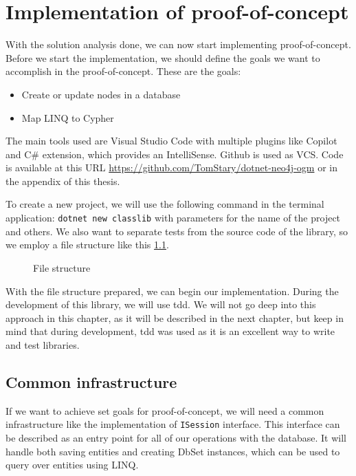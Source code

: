 \chapter {Implementation of proof-of-concept}

With the solution analysis done, we can now start implementing proof-of-concept.
Before we start the implementation, we should define the goals we want to accomplish in the proof-of-concept.
These are the goals:
\begin{itemize}
    \item {Create or update nodes in a database}
    \item {Map LINQ to Cypher}
\end{itemize}

The main tools used are Visual Studio Code with multiple plugins like Copilot and C\# extension, which provides an IntelliSense.
Github is used as VCS. Code is available at this URL \url{https://github.com/TomStary/dotnet-neo4j-ogm} or in the appendix of this thesis.

To create a new project, we will use the following command in the terminal application: \texttt{dotnet new classlib} with parameters for the name of the project and others.
We also want to separate tests from the source code of the library, so we employ a file structure like this \ref{ref:fileStructure}.

\begin{figure}[H]
    \caption{File structure}
    \label{ref:fileStructure}
\end{figure}

With the file structure prepared, we can begin our implementation. During the development of this
library, we will use \acrfull{tdd}. We will not go deep into this approach in this chapter,
as it will be described in the next chapter, but keep in mind that during development, \acrshort{tdd} was used as it is an excellent way to write and test libraries.

\section {Common infrastructure}

If we want to achieve set goals for proof-of-concept, we will need a common infrastructure like the implementation of \texttt{ISession} interface.
This interface can be described as an entry point for all of our operations with the database. It will handle both saving entities and creating DbSet
instances, which can be used to query over entities using LINQ.

